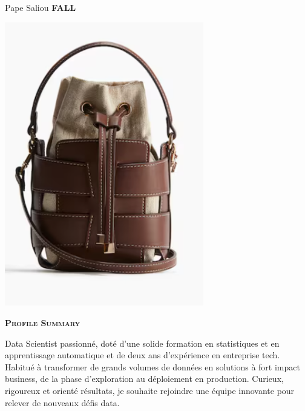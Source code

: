 \documentclass[11pt,a4paper]{article}
\newcommand{\headleft}[1]{\vspace*{3ex}\textsc{\textbf{#1}}\par%
    \vspace*{-1.5ex}\hrulefill\par\vspace*{0.7ex}}
\begin{document}
\setlength{\topskip}{0pt}\setlength{\parindent}{0pt}\setlength{\parskip}{0pt}
\setlength{\fboxsep}{0pt}\pagestyle{empty}\raggedbottom

\begin{minipage}[t]{0.33\textwidth}
\colorbox{cvblue}{\begin{minipage}[t][5mm][t]{\textwidth}\null\hfill\null\end{minipage}}
\vspace{-.2ex}
\colorbox{cvblue!90}{\color{white}
\textwidth
\begin{minipage}[t][293mm][t]{0.82\textwidth}\raggedright
\vspace*{2.5ex}

\Large Pape Saliou \textbf{\textsc{FALL}} \normalsize

\null\hfill\includegraphics[width=0.65\textwidth]{86cd7172f1804c05959bb62885ba4165.png}\hfill\null

\vspace*{0.5ex}

\headleft{Profile Summary}
Data Scientist passionné, doté d’une solide formation en statistiques et en apprentissage automatique et de deux ans d’expérience en entreprise tech. Habitué à transformer de grands volumes de données en solutions à fort impact business, de la phase d’exploration au déploiement en production. Curieux, rigoureux et orienté résultats, je souhaite rejoindre une équipe innovante pour relever de nouveaux défis data.


\end{minipage}}
\end{minipage}
\end{document}

